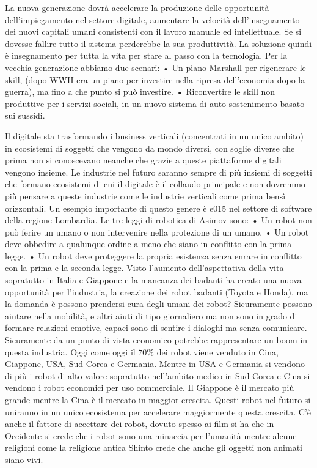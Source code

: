 \documentclass[11pt, a4page, twocolumn]{article}
\begin{document}
La nuova generazione dovrà accelerare la produzione delle opportunità dell’impiegamento nel settore digitale, aumentare la velocità dell’insegnamento dei nuovi capitali umani consistenti con il lavoro manuale ed intellettuale. Se si dovesse fallire tutto il sistema perderebbe la sua produttività. La soluzione quindi è insegnamento per tutta la vita per stare al passo con la tecnologia.
Per la vecchia generazione abbiamo due scenari:
    • Un piano Marshall per rigenerare le skill, (dopo WWII era un piano per investire nella ripresa dell’economia dopo la guerra), ma fino a che punto si può investire.
    • Riconvertire le skill non produttive per i servizi sociali, in un nuovo sistema di auto sostenimento basato sui sussidi.

Il digitale sta trasformando i business verticali (concentrati in un unico ambito) in ecosistemi di soggetti che vengono da mondo diversi, con soglie diverse che prima non si conoscevano neanche che grazie a queste piattaforme digitali vengono insieme. Le industrie nel futuro saranno sempre di più insiemi di soggetti che formano ecosistemi di cui il digitale è il collaudo principale e non dovremmo più pensare a queste industrie come le industrie verticali come prima bensì orizzontali. Un esempio importante di questo genere è e015 nel settore di software della regione Lombardia.
Le tre leggi di robotica di Asimov sono:
    • Un robot non può ferire un umano o non intervenire nella protezione di un umano.
    • Un robot deve obbedire a qualunque ordine a meno che siano in conflitto con la prima legge.
    • Un robot deve proteggere la propria esistenza senza enrare in conflitto con la prima e la seconda legge.
Visto l’aumento dell’aspettativa della vita sopratutto in Italia e Giappone e la mancanza dei badanti ha creato una nuova opportunità per l’industria, la creazione dei robot badanti (Toyota e Honda), ma la domanda è possono prendersi cura degli umani dei robot? Sicuramente possono aiutare nella mobilità, e altri aiuti di tipo giornaliero ma non sono in grado di formare relazioni emotive, capaci sono di sentire i dialoghi ma senza comunicare. Sicuramente da un punto di vista economico potrebbe rappresentare un boom in questa industria. Oggi come oggi il $70\%$ dei robot viene venduto in Cina, Giappone, USA, Sud Corea e Germania. Mentre in USA e Germania si vendono di più i robot di alto valore sopratutto nell’ambito medico in Sud Corea e Cina si vendono i robot  economici per uso commerciale. Il Giappone è il mercato più grande mentre la Cina è il mercato in maggior crescita. Questi robot nel futuro si uniranno in un unico ecosistema per accelerare maggiormente questa crescita. C’è anche il fattore di accettare dei robot, dovuto spesso ai film si ha che in Occidente si crede che i robot sono una minaccia per l’umanità mentre alcune religioni come la religione antica Shinto crede che anche gli oggetti non animati siano vivi. 
\end{document}
